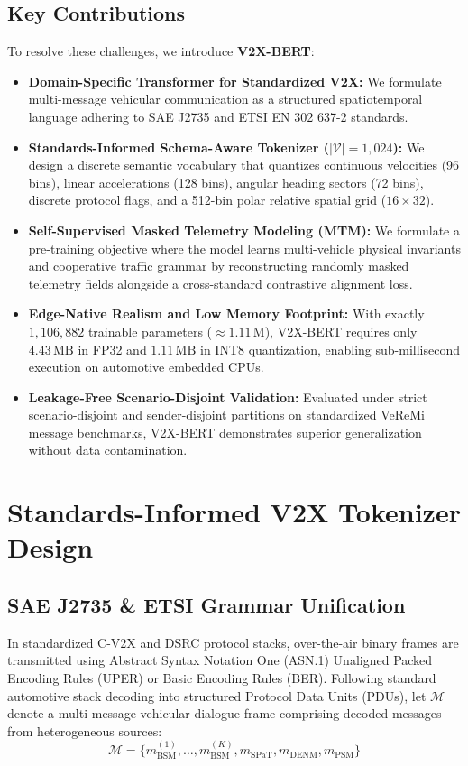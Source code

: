 \documentclass[journal,compsoc]{IEEEtran}
\begin{document}
\subsection{Key Contributions}
To resolve these challenges, we introduce \textbf{V2X-BERT}:
\begin{itemize}
    \item \textbf{Domain-Specific Transformer for Standardized V2X:} We formulate multi-message vehicular communication as a structured spatiotemporal language adhering to SAE J2735 and ETSI EN 302 637-2 standards.
    \item \textbf{Standards-Informed Schema-Aware Tokenizer ($|\mathcal{V}| = 1,024$):} We design a discrete semantic vocabulary that quantizes continuous velocities (96 bins), linear accelerations (128 bins), angular heading sectors (72 bins), discrete protocol flags, and a 512-bin polar relative spatial grid ($16 \times 32$).
    \item \textbf{Self-Supervised Masked Telemetry Modeling (MTM):} We formulate a pre-training objective where the model learns multi-vehicle physical invariants and cooperative traffic grammar by reconstructing randomly masked telemetry fields alongside a cross-standard contrastive alignment loss.
    \item \textbf{Edge-Native Realism and Low Memory Footprint:} With exactly $1,106,882$ trainable parameters ($\approx 1.11\,\text{M}$), V2X-BERT requires only $4.43\,\text{MB}$ in FP32 and $1.11\,\text{MB}$ in INT8 quantization, enabling sub-millisecond execution on automotive embedded CPUs.
    \item \textbf{Leakage-Free Scenario-Disjoint Validation:} Evaluated under strict scenario-disjoint and sender-disjoint partitions on standardized VeReMi message benchmarks, V2X-BERT demonstrates superior generalization without data contamination.
\end{itemize}

\section{Standards-Informed V2X Tokenizer Design}

\subsection{SAE J2735 \& ETSI Grammar Unification}
In standardized C-V2X and DSRC protocol stacks, over-the-air binary frames are transmitted using Abstract Syntax Notation One (ASN.1) Unaligned Packed Encoding Rules (UPER) or Basic Encoding Rules (BER). Following standard automotive stack decoding into structured Protocol Data Units (PDUs), let $\mathcal{M}$ denote a multi-message vehicular dialogue frame comprising decoded messages from heterogeneous sources:
\begin{equation}
\mathcal{M} = \{ m_{\text{BSM}}^{(1)}, \dots, m_{\text{BSM}}^{(K)}, m_{\text{SPaT}}, m_{\text{DENM}}, m_{\text{PSM}} \}
\end{equation}
\end{document}
